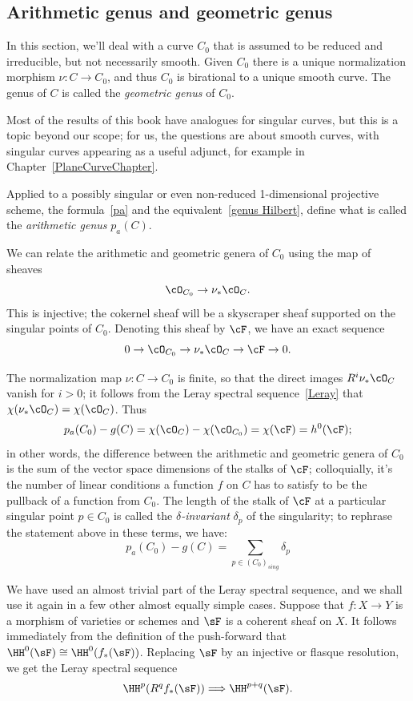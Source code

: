 \subsection{Arithmetic genus and geometric genus}
In this section, we'll deal with a  curve $C_0$ that is assumed to be reduced and irreducible, but not necessarily smooth.
Given $C_0$ there is a unique normalization morphism $\nu: C \to C_0$, and thus $C_0$ is birational to a unique
smooth curve. The genus of $C$ is called the \emph{geometric genus} of $C_0$.

Most of the results of this book have analogues for singular curves, but this is a topic beyond our scope; for us, the questions are about smooth curves, with singular curves appearing as a useful adjunct, for example in Chapter~\ref{PlaneCurveChapter}.

Applied to a possibly singular or even non-reduced 1-dimensional projective scheme, the formula~\ref{pa} and the equivalent~\ref{genus Hilbert}, define
what is called the \emph{arithmetic genus} $p_a(C)$. 

We can relate the arithmetic and geometric genera of $C_0$ using the map of sheaves
$$
\cO_{C_0} \to \nu_*\cO_C.
$$
This is injective; the cokernel sheaf will be a skyscraper sheaf supported on the singular points of $C_0$. Denoting this sheaf by $\cF$, we have an exact sequence
$$
0 \to \cO_{C_0} \to \nu_*\cO_C \to \cF \to 0.
$$


The normalization map $\nu: C \to C_0$ is finite, so that the direct images $R^i\nu_*\cO_C$ vanish for $i > 0$; it follows from the Leray spectral sequence~\ref{Leray} that $\chi(\nu_*\cO_C) = \chi(\cO_C)$. Thus
$$
p_a(C_0) - g(C) =  \chi(\cO_{C}) -   \chi(\cO_{C_0}) = \chi(\cF) = h^0(\cF);
$$ 
in other words, the difference between the arithmetic and geometric genera of $C_0$ is the sum of the vector space dimensions of the stalks of $\cF$; colloquially, it's the number of linear conditions a function $f$ on $C$ has to satisfy to be the pullback of a function from $C_0$. The length of the stalk of $\cF$ at a particular singular point $p \in C_0$ is called the \emph{$\delta$-invariant} $\delta_p$ of the singularity; to rephrase the statement above in these terms, we have:
$$
p_a(C_0) - g(C) = \sum_{p \in (C_0)_{sing}} \delta_p
$$ 

\begin{fact}\label{Leray}
 We have used an almost trivial part of the Leray spectral sequence, and we shall use it again in a few other almost equally simple cases. Suppose that $f:X\to Y$ is a morphism of varieties or schemes
 and $\sF$ is a coherent sheaf on $X$.
  It follows immediately from the definition of the push-forward that $\HH^0(\sF) \cong \HH^0(f_*(\sF))$. Replacing
  $\sF$ by an injective or flasque resolution, we get the Leray spectral sequence
  $$
  \HH^p(R^qf_*(\sF)) \Longrightarrow \HH^{p+q}(\sF).
  $$
 \end{fact}
  


